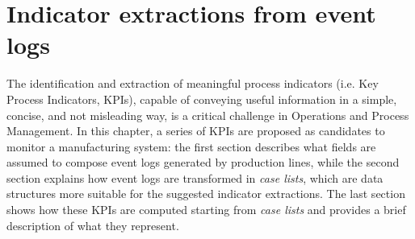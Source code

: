 \chapter{Indicator extractions from event logs}
\label{chapter 4}
\ifpdf
    \graphicspath{{Chapter4/Figs/}{Chapter4/Figs/PDF/}{Chapter4/Figs/}}
\else
    \graphicspath{{Chapter4/Figs/Vector/}{Chapter4/Figs/}}
\fi
The identification and extraction of meaningful process indicators (i.e. Key Process Indicators, KPIs), capable of conveying useful information in a simple, concise, and not misleading way, is a critical challenge in Operations and Process Management. In this chapter, a series of KPIs are proposed as candidates to monitor a manufacturing system: the first section describes what fields are assumed to compose event logs generated by production lines, while the second section explains how event logs are transformed in \textit{case lists}, which are data structures more suitable for the suggested indicator extractions. The last section shows how these KPIs are computed starting from \textit{case lists} and provides a brief description of what they represent.
